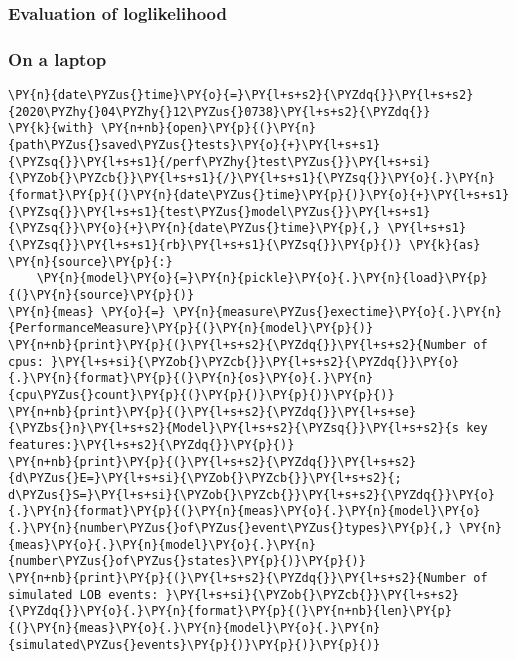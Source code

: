 \documentclass[10pt, article,table]{article}
\begin{document}
\subsubsection{Evaluation of loglikelihood}

\subsubsection*{On a laptop}
   \begin{tcolorbox}[breakable, size=fbox, boxrule=1pt, pad at break*=1mm,colback=cellbackground, colframe=cellborder]
\begin{Verbatim}[commandchars=\\\{\}, fontsize=\small]
\PY{n}{date\PYZus{}time}\PY{o}{=}\PY{l+s+s2}{\PYZdq{}}\PY{l+s+s2}{2020\PYZhy{}04\PYZhy{}12\PYZus{}0738}\PY{l+s+s2}{\PYZdq{}}
\PY{k}{with} \PY{n+nb}{open}\PY{p}{(}\PY{n}{path\PYZus{}saved\PYZus{}tests}\PY{o}{+}\PY{l+s+s1}{\PYZsq{}}\PY{l+s+s1}{/perf\PYZhy{}test\PYZus{}}\PY{l+s+si}{\PYZob{}\PYZcb{}}\PY{l+s+s1}{/}\PY{l+s+s1}{\PYZsq{}}\PY{o}{.}\PY{n}{format}\PY{p}{(}\PY{n}{date\PYZus{}time}\PY{p}{)}\PY{o}{+}\PY{l+s+s1}{\PYZsq{}}\PY{l+s+s1}{test\PYZus{}model\PYZus{}}\PY{l+s+s1}{\PYZsq{}}\PY{o}{+}\PY{n}{date\PYZus{}time}\PY{p}{,} \PY{l+s+s1}{\PYZsq{}}\PY{l+s+s1}{rb}\PY{l+s+s1}{\PYZsq{}}\PY{p}{)} \PY{k}{as} \PY{n}{source}\PY{p}{:}
    \PY{n}{model}\PY{o}{=}\PY{n}{pickle}\PY{o}{.}\PY{n}{load}\PY{p}{(}\PY{n}{source}\PY{p}{)}
\PY{n}{meas} \PY{o}{=} \PY{n}{measure\PYZus{}exectime}\PY{o}{.}\PY{n}{PerformanceMeasure}\PY{p}{(}\PY{n}{model}\PY{p}{)}
\PY{n+nb}{print}\PY{p}{(}\PY{l+s+s2}{\PYZdq{}}\PY{l+s+s2}{Number of cpus: }\PY{l+s+si}{\PYZob{}\PYZcb{}}\PY{l+s+s2}{\PYZdq{}}\PY{o}{.}\PY{n}{format}\PY{p}{(}\PY{n}{os}\PY{o}{.}\PY{n}{cpu\PYZus{}count}\PY{p}{(}\PY{p}{)}\PY{p}{)}\PY{p}{)}
\PY{n+nb}{print}\PY{p}{(}\PY{l+s+s2}{\PYZdq{}}\PY{l+s+se}{\PYZbs{}n}\PY{l+s+s2}{Model}\PY{l+s+s2}{\PYZsq{}}\PY{l+s+s2}{s key features:}\PY{l+s+s2}{\PYZdq{}}\PY{p}{)}
\PY{n+nb}{print}\PY{p}{(}\PY{l+s+s2}{\PYZdq{}}\PY{l+s+s2}{d\PYZus{}E=}\PY{l+s+si}{\PYZob{}\PYZcb{}}\PY{l+s+s2}{; d\PYZus{}S=}\PY{l+s+si}{\PYZob{}\PYZcb{}}\PY{l+s+s2}{\PYZdq{}}\PY{o}{.}\PY{n}{format}\PY{p}{(}\PY{n}{meas}\PY{o}{.}\PY{n}{model}\PY{o}{.}\PY{n}{number\PYZus{}of\PYZus{}event\PYZus{}types}\PY{p}{,} \PY{n}{meas}\PY{o}{.}\PY{n}{model}\PY{o}{.}\PY{n}{number\PYZus{}of\PYZus{}states}\PY{p}{)}\PY{p}{)}
\PY{n+nb}{print}\PY{p}{(}\PY{l+s+s2}{\PYZdq{}}\PY{l+s+s2}{Number of simulated LOB events: }\PY{l+s+si}{\PYZob{}\PYZcb{}}\PY{l+s+s2}{\PYZdq{}}\PY{o}{.}\PY{n}{format}\PY{p}{(}\PY{n+nb}{len}\PY{p}{(}\PY{n}{meas}\PY{o}{.}\PY{n}{model}\PY{o}{.}\PY{n}{simulated\PYZus{}events}\PY{p}{)}\PY{p}{)}\PY{p}{)}
\end{Verbatim}
\end{tcolorbox}
\end{document}
